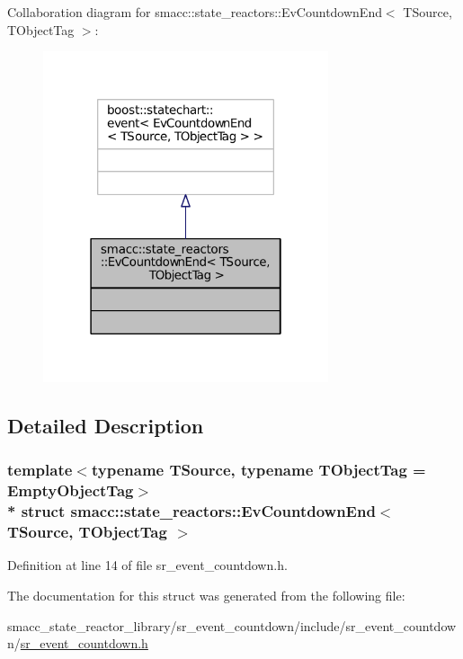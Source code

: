 Collaboration diagram for smacc\+:\+:state\+\_\+reactors\+:\+:Ev\+Countdown\+End$<$ T\+Source, T\+Object\+Tag $>$\+:
\nopagebreak
\begin{figure}[H]
\begin{center}
\leavevmode
\includegraphics[width=238pt]{structsmacc_1_1state__reactors_1_1EvCountdownEnd__coll__graph}
\end{center}
\end{figure}


\subsection{Detailed Description}
\subsubsection*{template$<$typename T\+Source, typename T\+Object\+Tag = Empty\+Object\+Tag$>$\\*
struct smacc\+::state\+\_\+reactors\+::\+Ev\+Countdown\+End$<$ T\+Source, T\+Object\+Tag $>$}



Definition at line 14 of file sr\+\_\+event\+\_\+countdown.\+h.



The documentation for this struct was generated from the following file\+:\begin{DoxyCompactItemize}
\item 
smacc\+\_\+state\+\_\+reactor\+\_\+library/sr\+\_\+event\+\_\+countdown/include/sr\+\_\+event\+\_\+countdown/\hyperlink{sr__event__countdown_8h}{sr\+\_\+event\+\_\+countdown.\+h}\end{DoxyCompactItemize}
